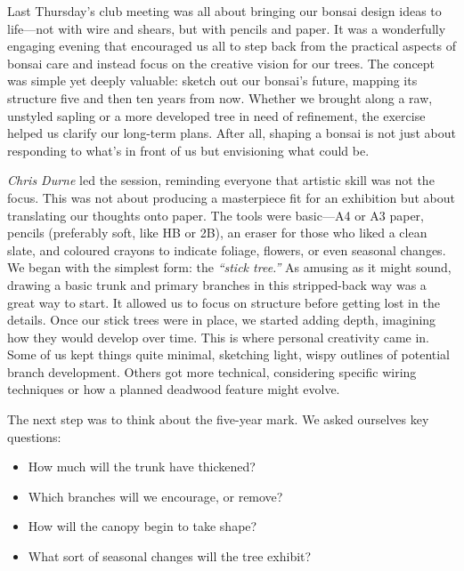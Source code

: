 \label{2025-03-workshop}
\noindent
Last Thursday's club meeting was all about bringing our bonsai design ideas to life---not with wire and shears, but with pencils and paper.
It was a wonderfully engaging evening that encouraged us all to step back from the practical aspects of bonsai care and instead focus on the creative vision for our trees.
The concept was simple yet deeply valuable: sketch out our bonsai's future, mapping its structure five and then ten years from now.
Whether we brought along a raw, unstyled sapling or a more developed tree in need of refinement, the exercise helped us clarify our long-term plans.
After all, shaping a bonsai is not just about responding to what's in front of us but envisioning what could be.

\medskip
{}
\noindent
\textit{Chris Durne} led the session, reminding everyone that artistic skill was not the focus.
This was not about producing a masterpiece fit for an exhibition but about translating our thoughts onto paper.
The tools were basic---A4 or A3 paper, pencils (preferably soft, like HB or 2B), an eraser for those who liked a clean slate, and coloured crayons to indicate foliage, flowers, or even seasonal changes.
We began with the simplest form: the \textit{``stick tree.''} As amusing as it might sound, drawing a basic trunk and primary branches in this stripped-back way was a great way to start.
It allowed us to focus on structure before getting lost in the details.
Once our stick trees were in place, we started adding depth, imagining how they would develop over time.
This is where personal creativity came in.
Some of us kept things quite minimal, sketching light, wispy outlines of potential branch development.
Others got more technical, considering specific wiring techniques or how a planned deadwood feature might evolve.

\medskip
{}
\noindent
The next step was to think about the five\--year mark.
We asked ourselves key questions:

\begin{itemize}
    \item How much will the trunk have thickened?
    
    \item Which branches will we encourage, or remove?
    
    \item How will the canopy begin to take shape?
    
    \item What sort of seasonal changes will the tree exhibit?
\end{itemize}

